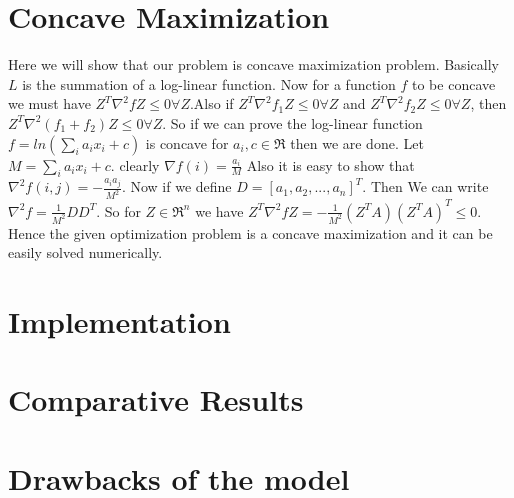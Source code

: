 \section*{Concave Maximization}
Here we will show that our problem is concave maximization problem. Basically $L$ is the summation of a log-linear function. Now for a function $f$ to be concave we must have $Z^{T}\nabla^{2}fZ \leq 0 \forall Z$.Also if $Z^{T}\nabla^{2}f_{1}Z \leq 0 \forall Z$ and $Z^{T}\nabla^{2}f_{2}Z \leq 0 \forall Z$, then $Z^{T}\nabla^{2}(f_{1}+f_{2})Z \leq 0 \forall Z$. So if we can prove the log-linear function $f = ln(\displaystyle\sum_{i}a_{i}x_{i} + c)$ is concave for $a_i,c \in \Re$ then we are done. Let $M = \displaystyle\sum_{i}a_{i}x_{i} + c$.
clearly $\nabla f (i) = \frac{a_i}{M}$
Also it is easy to show that $\nabla^2 f (i,j) = -\frac{a_ia_j}{M^2}$. Now if we define $D = [a_1,a_2,...,a_n]^T$. Then We can write $\nabla^2 f = \frac{1}{M^2} DD^T$. So for $Z \in \Re^n$ we have $Z^{T}\nabla^{2}fZ = -\frac{1}{M^2} (Z^TA)(Z^TA)^T \leq 0$. Hence the given optimization problem is a concave maximization and it can be easily solved numerically.
\section*{Implementation}

\section*{Comparative Results}
\section*{Drawbacks of the model}